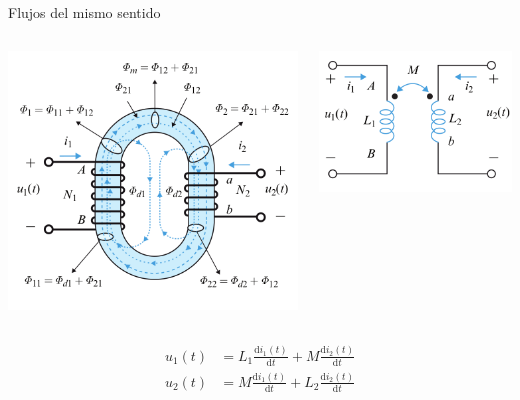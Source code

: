 \documentclass[xcolor={usenames,svgnames,dvipsnames}]{beamer}
\begin{document}
\begin{frame}[label={sec:org61b823a}]{Flujos del mismo sentido}
\begin{columns}
\begin{column}{0.5\columnwidth}
\begin{center}
\includegraphics[width=.9\linewidth]{figs/Acoplamiento1.png}
\end{center}
\end{column}

\begin{column}{0.5\columnwidth}
\begin{center}
\includegraphics[width=.9\linewidth]{figs/Acoplamiento1_circuito.png}
\end{center}
\end{column}
\end{columns}

\begin{align*}
  u_1(t) &= L_1 \frac{\mathrm{d}i_1(t)}{\mathrm{d}t} + M \frac{\mathrm{d}i_2(t)}{\mathrm{d}t}\\
  u_2(t) &= M \frac{\mathrm{d}i_1(t)}{\mathrm{d}t} + L_2 \frac{\mathrm{d}i_2(t)}{\mathrm{d}t}
\end{align*}
\end{frame}
\end{document}
